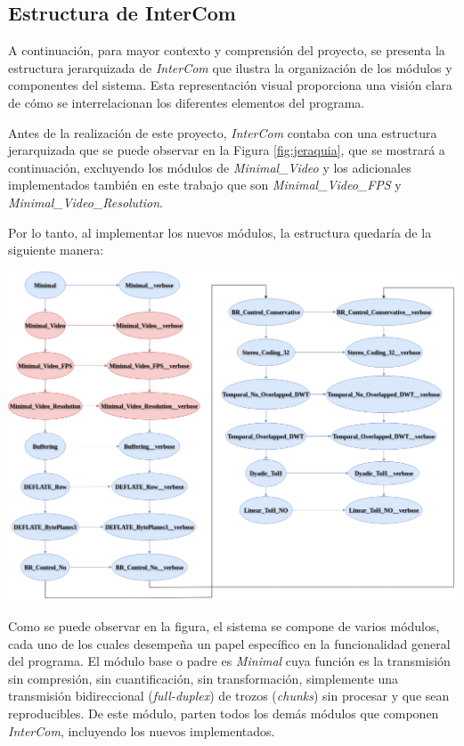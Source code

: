 \subsection{Estructura de InterCom}

A continuación, para mayor contexto y comprensión del proyecto, se presenta la estructura jerarquizada de \textit{InterCom} que ilustra la organización de los módulos y componentes del sistema. Esta representación visual proporciona una visión clara de cómo se interrelacionan los diferentes elementos del programa.
\vspace{\baselineskip}

Antes de la realización de este proyecto, \textit{InterCom} contaba con una estructura jerarquizada que se puede observar en la Figura \ref{fig:jeraquia}, que se mostrará a continuación, excluyendo los módulos de \textit{Minimal\_Video} y los adicionales implementados también en este trabajo que son \textit{Minimal\_Video\_FPS} y \\
\textit{Minimal\_Video\_Resolution}. 

\vspace{\baselineskip}
Por lo tanto, al implementar los nuevos módulos, la estructura quedaría de la siguiente manera:

\begin{center}
	\includegraphics[width = 1.01\textwidth]{images/jerarquia_modulos.png}
	\label{fig:jeraquia}
\end{center}

\vspace{\baselineskip}
Como se puede observar en la figura, el sistema se compone de varios módulos, cada uno de los cuales desempeña un papel específico en la funcionalidad general del programa. El módulo base o padre es \textit{Minimal} cuya función es la transmisión sin compresión, sin cuantificación, sin transformación, simplemente una transmisión bidireccional (\textit{full-duplex}) de trozos (\textit{chunks}) sin procesar y que sean reproducibles. De este módulo, parten todos los demás módulos que componen \textit{InterCom}, incluyendo los nuevos implementados. 
\vspace{\baselineskip}

